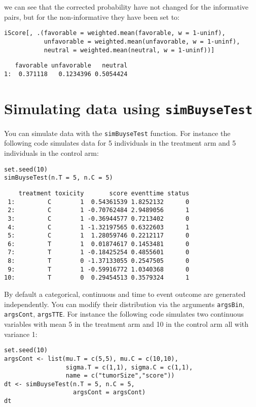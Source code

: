 \documentclass[12pt]{article}
\begin{document}
we can see that the corrected probability have not changed for the
informative pairs, but for the non-informative they have been set to:
\lstset{language=r,label= ,caption= ,captionpos=b,numbers=none}
\begin{lstlisting}
iScore[, .(favorable = weighted.mean(favorable, w = 1-uninf), 
		   unfavorable = weighted.mean(unfavorable, w = 1-uninf), 
		   neutral = weighted.mean(neutral, w = 1-uninf))]
\end{lstlisting}

\begin{verbatim}
   favorable unfavorable   neutral
1:  0.371118   0.1234396 0.5054424
\end{verbatim}

\clearpage

\section{Simulating data using \texttt{simBuyseTest}}
\label{sec:org8e1e287}
You can simulate data with the \texttt{simBuyseTest} function. For instance
the following code simulates data for 5 individuals in the treatment
arm and 5 individuals in the control arm:
\lstset{language=r,label= ,caption= ,captionpos=b,numbers=none}
\begin{lstlisting}
set.seed(10)
simBuyseTest(n.T = 5, n.C = 5)
\end{lstlisting}

\begin{verbatim}
    treatment toxicity       score eventtime status
 1:         C        1  0.54361539 1.8252132      0
 2:         C        1 -0.70762484 2.9489056      1
 3:         C        1 -0.36944577 0.7213402      0
 4:         C        1 -1.32197565 0.6322603      1
 5:         C        1  1.28059746 0.2212117      0
 6:         T        1  0.01874617 0.1453481      0
 7:         T        1 -0.18425254 0.4855601      0
 8:         T        0 -1.37133055 0.2547505      0
 9:         T        1 -0.59916772 1.0340368      0
10:         T        0  0.29454513 0.3579324      1
\end{verbatim}

By default a categorical, continuous and time to event outcome are
generated independently. You can modify their distribution via the
arguments \texttt{argsBin}, \texttt{argsCont}, \texttt{argsTTE}. For instance the following
code simulates two continuous variables with mean 5 in the treatment
arm and 10 in the control arm all with variance 1:
\lstset{language=r,label= ,caption= ,captionpos=b,numbers=none}
\begin{lstlisting}
set.seed(10)
argsCont <- list(mu.T = c(5,5), mu.C = c(10,10), 
				 sigma.T = c(1,1), sigma.C = c(1,1),
				 name = c("tumorSize","score"))
dt <- simBuyseTest(n.T = 5, n.C = 5,
				   argsCont = argsCont)
dt
\end{lstlisting}
\end{document}
